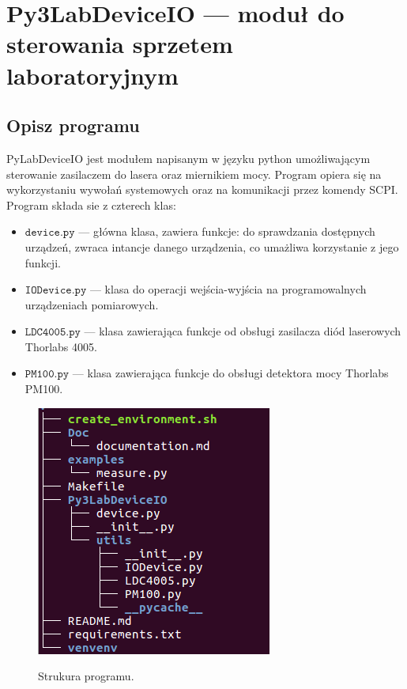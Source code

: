 \documentclass[a4paper, portrait,12pt]{report}
\begin{document}
\newpage

\chapter{Py3LabDeviceIO --- moduł do sterowania sprzetem laboratoryjnym}
\section{Opisz programu}
PyLabDeviceIO jest modułem napisanym w języku python umożliwającym sterowanie zasilaczem do lasera oraz miernikiem mocy. Program opiera się na wykorzystaniu wywołań systemowych oraz na komunikacji przez komendy SCPI. \\

Program składa sie z czterech klas:
\begin{itemize}
\item $\mathtt{device.py}$ --- główna klasa, zawiera funkcje: do sprawdzania dostępnych urządzeń, 
zwraca intancje danego urządzenia, co umażliwa korzystanie z jego funkcji. 
\item $\mathtt{IODevice.py}$ --- klasa do operacji wejścia-wyjścia na programowalnych urządzeniach pomiarowych.
\item $\mathtt{LDC4005.py}$ --- klasa zawierająca funkcje od obsługi zasilacza diód laserowych Thorlabs 4005.
\item $\mathtt{PM100.py}$ --- klasa zawierająca funkcje do obsługi detektora mocy Thorlabs PM100.
\end{itemize}
\begin{figure}[h]
\center
  \includegraphics[scale=0.45]{tree.png}
  \label{rys1}
  \caption{Strukura programu.} 
\end{figure}
\end{document}
